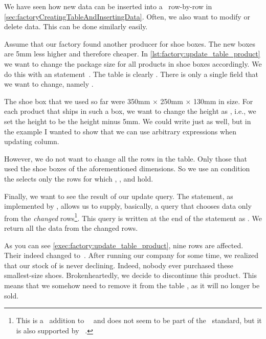 %
%
%
%
%
We have seen how new data can be inserted into a \db\ row-by-row in \cref{sec:factoryCreatingTableAndInsertingData}.
Often, we also want to modify or delete data.
This can be done similarly easily.

Assume that our factory found another producer for shoe boxes.
The new boxes are 5mm less higher and therefore cheaper.
In \cref{lst:factory:update_table_product} we want to change the package size for all products in shoe boxes accordingly.
We do this with an  statement~\cite{PGDG:PD:U}.%
%
%
%
%
%
%
The table is clearly .
There is only a single field that we want to change, namely .

The shoe box that we used so far were 350mm $\times$ 250mm $\times$ 130mm in size.
For each product that ships in such a box, we want to change the height as , i.e., we set the  height to be the  height minus 5mm.
We could write  just as well, but in the example I wanted to show that we can use arbitrary expressions when updating column.

However, we do not want to change all the rows in the table.
Only those that used the shoe boxes of the aforementioned dimensions.
So we use an  condition the selects only the rows for which , , and  hold.

Finally, we want to see the result of our update query.
The  statement, as implemented by \postgresql, allows us to supply, basically, a  query that chooses data only from the \emph{changed} rows\footnote{This is a \postgresql\ addition to~\sql~\cite{SE:DA:2020WDSSOAOTNPSDIOR} and does not seem to be part of the \sql\ standard, but it is also supported by \sqlite~\cite{HWACIS:R}.}.
This query is written at the end of the statement as .
We return all the data from the changed rows.

As you can see \cref{exec:factory:update_table_product}, nine rows are affected.
Their  indeed changed to~.
\endhsection%
%
%
%
%
After running our company for some time, we realized that our stock of  is never declining.
Indeed, nobody ever purchased these smallest-size shoes.
Brokenheartedly, we decide to discontinue this product.
This means that we somehow need to remove it from the table , as it will no longer be sold.

